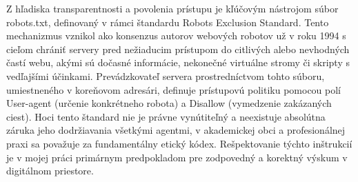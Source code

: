 Z hľadiska transparentnosti a povolenia prístupu je kľúčovým nástrojom súbor robots.txt, definovaný v rámci štandardu Robots Exclusion Standard. Tento mechanizmus vznikol ako konsenzus autorov webových robotov už v roku 1994 s cieľom chrániť servery pred nežiaducim prístupom do citlivých alebo nevhodných častí webu, akými sú dočasné informácie, nekonečné virtuálne stromy či skripty s vedľajšími účinkami. Prevádzkovateľ servera prostredníctvom tohto súboru, umiestneného v koreňovom adresári, definuje prístupovú politiku pomocou polí User-agent (určenie konkrétneho robota) a Disallow (vymedzenie zakázaných ciest). Hoci tento štandard nie je právne vynútiteľný a neexistuje absolútna záruka jeho dodržiavania všetkými agentmi, v akademickej obci a profesionálnej praxi sa považuje za fundamentálny etický kódex. Rešpektovanie týchto inštrukcií je v mojej práci primárnym predpokladom pre zodpovedný a korektný výskum v digitálnom priestore.
